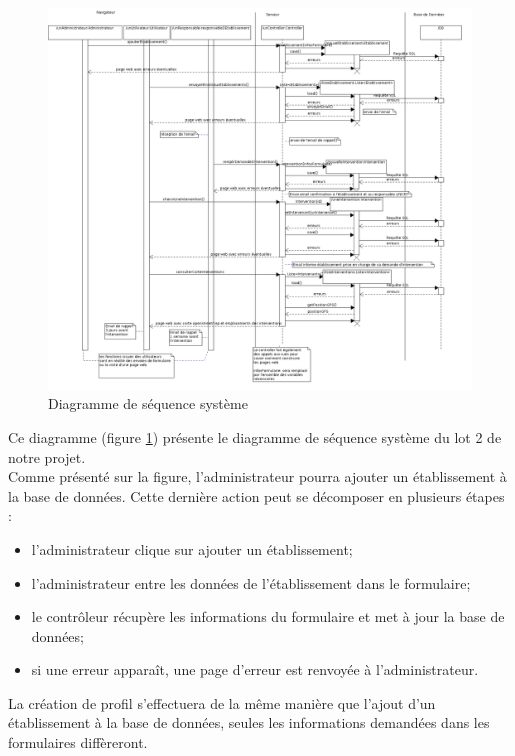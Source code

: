 \begin{figure}[H]
\centering 
\includegraphics[scale=0.34]{images/diagrammeSequenceSysteme/diagrammeSequence.png}
\caption{Diagramme de séquence système}
\label{diagrammeDeSequenceSysteme}
\end{figure}

Ce diagramme (figure \ref{diagrammeDeSequenceSysteme}) présente le diagramme de séquence système du lot 2 de notre projet. \\
Comme présenté sur la figure, l'administrateur pourra ajouter un établissement à la base de données. Cette dernière action peut se décomposer en plusieurs étapes : 
\begin{itemize}
	\item l'administrateur clique sur ajouter un établissement;
	\item l'administrateur entre les données de l'établissement dans le formulaire;
	\item le contrôleur récupère les informations du formulaire et met à jour la base de données;
	\item si une erreur apparaît, une page d'erreur est renvoyée à l'administrateur.\\
\end{itemize}


La création de profil s'effectuera de la même manière que l'ajout d'un établissement à la base de données, seules les informations demandées dans les formulaires diffèreront.\\



